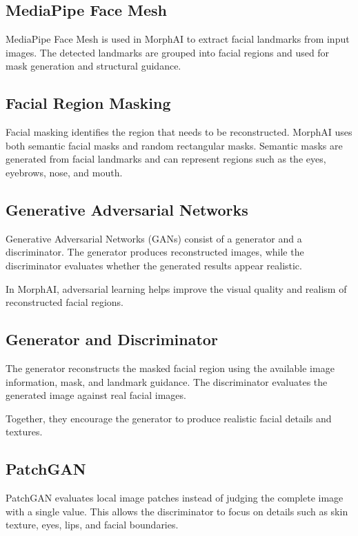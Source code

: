 \subsection{MediaPipe Face Mesh}

MediaPipe Face Mesh is used in MorphAI to extract facial landmarks from input images. The detected landmarks are grouped into facial regions and used for mask generation and structural guidance.

\subsection{Facial Region Masking}

Facial masking identifies the region that needs to be reconstructed. MorphAI uses both semantic facial masks and random rectangular masks. Semantic masks are generated from facial landmarks and can represent regions such as the eyes, eyebrows, nose, and mouth.

\subsection{Generative Adversarial Networks}

Generative Adversarial Networks (GANs) consist of a generator and a discriminator. The generator produces reconstructed images, while the discriminator evaluates whether the generated results appear realistic.

\noindent In MorphAI, adversarial learning helps improve the visual quality and realism of reconstructed facial regions.

\subsection{Generator and Discriminator}

The generator reconstructs the masked facial region using the available image information, mask, and landmark guidance. The discriminator evaluates the generated image against real facial images.

\noindent Together, they encourage the generator to produce realistic facial details and textures.

\subsection{PatchGAN}

PatchGAN evaluates local image patches instead of judging the complete image with a single value. This allows the discriminator to focus on details such as skin texture, eyes, lips, and facial boundaries.


